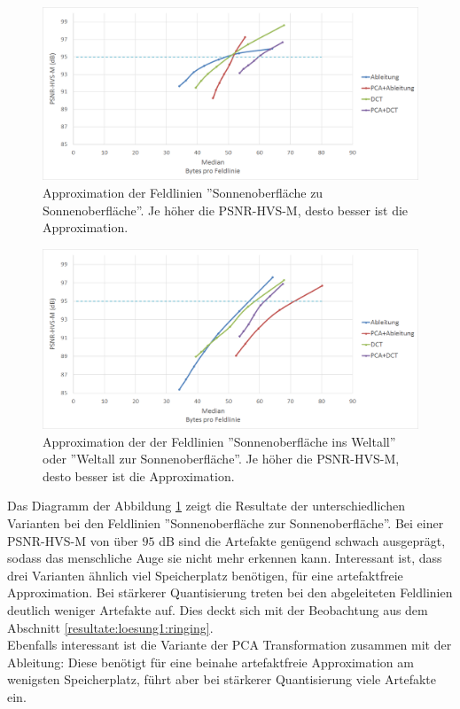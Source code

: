 \begin{figure}[!htbp]
	\center	\includegraphics[width=1\textwidth,keepaspectratio]{./pictures/resultate/loesung1/ringing/sts.png}
	\caption{Approximation der Feldlinien ''Sonnenoberfläche zu Sonnenoberfläche''. Je höher die PSNR-HVS-M, desto besser ist die Approximation. }	\label{resultate:loesung1:dct:behandlung_ringing:sts}
\end{figure} 
\begin{figure}[!htbp]
	\center
\includegraphics[width=1\textwidth,keepaspectratio]{./pictures/resultate/loesung1/ringing/nosts.png}
	\caption{Approximation der der Feldlinien ''Sonnenoberfläche ins Weltall'' oder ''Weltall zur Sonnenoberfläche''. Je höher die PSNR-HVS-M, desto besser ist die Approximation.}	\label{resultate:loesung1:dct:behandlung_ringing:nosts}
\end{figure}
Das Diagramm der Abbildung \ref{resultate:loesung1:dct:behandlung_ringing:sts} zeigt die Resultate der unterschiedlichen Varianten bei den Feldlinien ''Sonnenoberfläche zur Sonnenoberfläche''. Bei einer PSNR-HVS-M von über $95$ dB sind die Artefakte genügend schwach ausgeprägt, sodass das menschliche Auge sie nicht mehr erkennen kann. Interessant ist, dass drei Varianten ähnlich viel Speicherplatz benötigen, für eine artefaktfreie Approximation. Bei stärkerer Quantisierung treten bei den abgeleiteten Feldlinien deutlich weniger Artefakte auf. Dies deckt sich mit der Beobachtung aus dem Abschnitt \ref{resultate:loesung1:ringing}.\\
Ebenfalls interessant ist die Variante der PCA Transformation zusammen mit der Ableitung: Diese benötigt für eine beinahe artefaktfreie Approximation am wenigsten Speicherplatz, führt aber bei stärkerer Quantisierung viele Artefakte ein.

